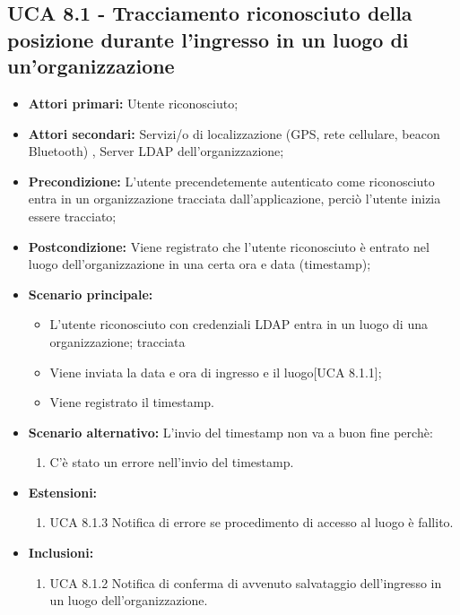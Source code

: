\subsection{UCA 8.1 - Tracciamento riconosciuto della posizione durante l'ingresso in un luogo di un'organizzazione}%
\begin{itemize}
\item \textbf{Attori primari:} Utente riconosciuto;
\item \textbf{Attori secondari:} Servizi/o di localizzazione (GPS, rete cellulare, beacon Bluetooth) , Server LDAP dell'organizzazione;
\item \textbf{Precondizione:} L'utente precendetemente autenticato come riconosciuto entra in un organizzazione tracciata dall'applicazione, perciò l'utente inizia essere tracciato;
\item \textbf{Postcondizione:} Viene registrato che l'utente riconosciuto è entrato nel luogo dell'organizzazione in una certa ora e data (timestamp);
\item \textbf{Scenario principale:}
	\begin{itemize}
	\item L'utente riconosciuto con credenziali LDAP entra in un luogo di una organizzazione; tracciata
	\item Viene inviata la data e ora di ingresso e il luogo[UCA 8.1.1];
	\item Viene registrato il timestamp.
\end{itemize}
\item \textbf{Scenario alternativo:} L'invio del timestamp non va a buon fine perchè:
\begin{enumerate}
	\item C'è stato un errore nell'invio del timestamp.
\end{enumerate}
\item \textbf{Estensioni:}
	\begin{enumerate}
		\item UCA 8.1.3 Notifica di errore se procedimento di accesso al luogo è fallito.
	\end{enumerate}
\item \textbf{Inclusioni:}
\begin{enumerate}
	\item UCA 8.1.2 Notifica di conferma di avvenuto salvataggio dell'ingresso in un luogo dell'organizzazione.
\end{enumerate}
\end{itemize}

